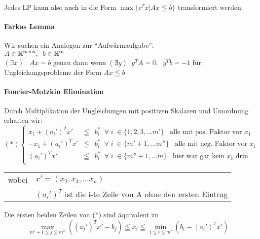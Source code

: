 Jedes LP kann also auch in die Form $\max \{c^{T}x| A x \leqq b\}$ transformiert
werden.

\paragraph{Farkas Lemma}
Wir suchen ein Analogon zur "`Aufwärmaufgabe"':\\
$A \in \mathbb{R}^{m\times n}, \; \; b \in \mathbb{R}^{m}$\\
$(\exists x) \; \;\; A x = b$ genau dann wenn $(\nexists y) \; \; y^{T}A
= 0, \; \; y^{T}b=-1$ für Ungleichungsprobleme der Form $A x\leqq b$


\paragraph{Fourier-Motzkin Elimination}

Durch Multiplikation der Ungleichungen mit positiven Skalaren und Umordnung
erhalten wir:
\[
(*)\left\{\begin{array}{rcl}
x_{1} + (a_{i}')^{T}  x'&\leqq& b^{*}_{i} \;\; \forall \; i\; \in
\{1,2,3,...m'\}\;\;\; \mbox{alle mit pos. Faktor vor $x_1$}\\
-x_{1} + (a_{i}')^{T}  x'&\leqq& b^{*}_{i} \;\; \forall \; i\; \in
\{m'+1,...m''\}\;\;\; \mbox{alle mit neg. Faktor vor $x_1$}\\
(a_{i}')^{T}  x'&\leqq& b^{*}_{i} \;\; \forall \; i\; \in
\{m''+1,...m\}\;\;\; \mbox{hier war gar kein $x_1$ drin}\\
\end{array}\right.
\]
\begin{tabular}{ll}
wobei&$x'=(x_{2}, x_{3},...x_{n})$\\
&$(a_{i}')^{T}$ ist die i-te Zeile von A ohne den ersten Eintrag
\end{tabular}

Die ersten beiden Zeilen von (*) sind äquivalent zu
\[\max_{m'+1\leqq j \leqq m''} \left((a_{j}')^{T} x' -b_{j}\right) \leqq x_{i}
\leqq \min_{1\leqq i \leqq m'} \left(b_{i} - (a_{i}')^{T}x'\right)\]

